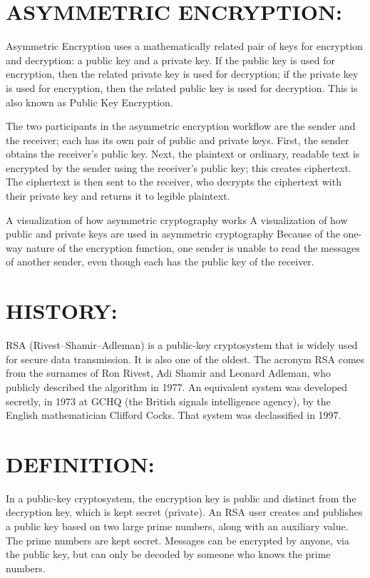\documentclass[12pt,fleqn]{article}
\begin{document}
\bigskip{}


\section{ASYMMETRIC ENCRYPTION:}

Asymmetric Encryption uses a mathematically related pair of keys for
encryption and decryption: a public key and a private key. If the
public key is used for encryption, then the related private key is
used for decryption; if the private key is used for encryption, then
the related public key is used for decryption. This is also known
as Public Key Encryption. 

The two participants in the asymmetric encryption workflow are the
sender and the receiver; each has its own pair of public and private
keys. First, the sender obtains the receiver's public key. Next, the
plaintext or ordinary, readable text is encrypted by the sender using
the receiver's public key; this creates ciphertext. The ciphertext
is then sent to the receiver, who decrypts the ciphertext with their
private key and returns it to legible plaintext.

A visualization of how asymmetric cryptography works A visualization
of how public and private keys are used in asymmetric cryptography
Because of the one-way nature of the encryption function, one sender
is unable to read the messages of another sender, even though each
has the public key of the receiver.

\bigskip{}


\section{HISTORY:}

RSA (Rivest--Shamir--Adleman) is a public-key cryptosystem that
is widely used for secure data transmission. It is also one of the
oldest. The acronym RSA comes from the surnames of Ron Rivest, Adi
Shamir and Leonard Adleman, who publicly described the algorithm in
1977. An equivalent system was developed secretly, in 1973 at GCHQ
(the British signals intelligence agency), by the English mathematician
Clifford Cocks. That system was declassified in 1997.

\bigskip{}


\section{DEFINITION:}

In a public-key cryptosystem, the encryption key is public and distinct
from the decryption key, which is kept secret (private). An RSA user
creates and publishes a public key based on two large prime numbers,
along with an auxiliary value. The prime numbers are kept secret.
Messages can be encrypted by anyone, via the public key, but can only
be decoded by someone who knows the prime numbers.
\end{document}
